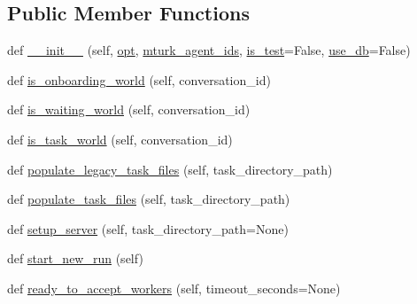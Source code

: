 \subsection*{Public Member Functions}
\begin{DoxyCompactItemize}
\item 
def \hyperlink{classparlai_1_1mturk_1_1core_1_1mturk__manager_1_1MTurkManager_a0ad49b45ee05a62062d4e680c6e6323e}{\+\_\+\+\_\+init\+\_\+\+\_\+} (self, \hyperlink{classparlai_1_1mturk_1_1core_1_1mturk__manager_1_1MTurkManager_a1167cb8359db58221b2843554731cf1b}{opt}, \hyperlink{classparlai_1_1mturk_1_1core_1_1mturk__manager_1_1MTurkManager_a87bbfdb15a8c5d57488bcd140cd1ede7}{mturk\+\_\+agent\+\_\+ids}, \hyperlink{classparlai_1_1mturk_1_1core_1_1mturk__manager_1_1MTurkManager_aba2c8855ba4baadd54a42a834aaf75bd}{is\+\_\+test}=False, \hyperlink{classparlai_1_1mturk_1_1core_1_1mturk__manager_1_1MTurkManager_ac0df4861da4263b50fd578e9506354b8}{use\+\_\+db}=False)
\item 
def \hyperlink{classparlai_1_1mturk_1_1core_1_1mturk__manager_1_1MTurkManager_a9368a0f0fa8eb1791e4a4206ce291e25}{is\+\_\+onboarding\+\_\+world} (self, conversation\+\_\+id)
\item 
def \hyperlink{classparlai_1_1mturk_1_1core_1_1mturk__manager_1_1MTurkManager_a09d491450292c9ce3da629fab48dda54}{is\+\_\+waiting\+\_\+world} (self, conversation\+\_\+id)
\item 
def \hyperlink{classparlai_1_1mturk_1_1core_1_1mturk__manager_1_1MTurkManager_a1c840892de0be91505aaed2ba01dfafe}{is\+\_\+task\+\_\+world} (self, conversation\+\_\+id)
\item 
def \hyperlink{classparlai_1_1mturk_1_1core_1_1mturk__manager_1_1MTurkManager_a0db9fb228caa9632dac18268f380771f}{populate\+\_\+legacy\+\_\+task\+\_\+files} (self, task\+\_\+directory\+\_\+path)
\item 
def \hyperlink{classparlai_1_1mturk_1_1core_1_1mturk__manager_1_1MTurkManager_a017804b28f3f57802dce14941e25903a}{populate\+\_\+task\+\_\+files} (self, task\+\_\+directory\+\_\+path)
\item 
def \hyperlink{classparlai_1_1mturk_1_1core_1_1mturk__manager_1_1MTurkManager_a3d662cb80767e781d91c6c87c2ef54b5}{setup\+\_\+server} (self, task\+\_\+directory\+\_\+path=None)
\item 
def \hyperlink{classparlai_1_1mturk_1_1core_1_1mturk__manager_1_1MTurkManager_a02acff72f25ec7a77edca9489fe3b804}{start\+\_\+new\+\_\+run} (self)
\item 
def \hyperlink{classparlai_1_1mturk_1_1core_1_1mturk__manager_1_1MTurkManager_a87cd3cf9d61dd1d0683e9e7b5359eb53}{ready\+\_\+to\+\_\+accept\+\_\+workers} (self, timeout\+\_\+seconds=None)

\end{DoxyCompactItemize}
